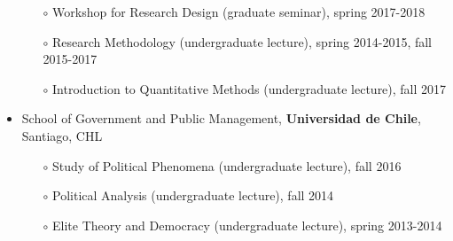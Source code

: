 \begin{publications}
\begin{itemize}
\begin{itemize}
\item[$\circ$]{\small Workshop for Research Design (graduate seminar), spring 2017-2018}
\item[$\circ$]{\small Research Methodology (undergraduate lecture), spring 2014-2015, fall 2015-2017}
\item[$\circ$]{\small Introduction to Quantitative Methods (undergraduate lecture), fall 2017}
\end{itemize}
\item{\small School of Government and Public Management, {\bfseries Universidad de Chile}, Santiago, CHL}
\begin{itemize}
\item[$\circ$]{\small Study of Political Phenomena (undergraduate lecture), fall 2016}
\item[$\circ$]{\small Political Analysis (undergraduate lecture), fall 2014}
\item[$\circ$]{\small Elite Theory and Democracy (undergraduate lecture), spring 2013-2014}
\end{itemize}
\end{itemize}

\vspace{1mm}
\end{publications}
